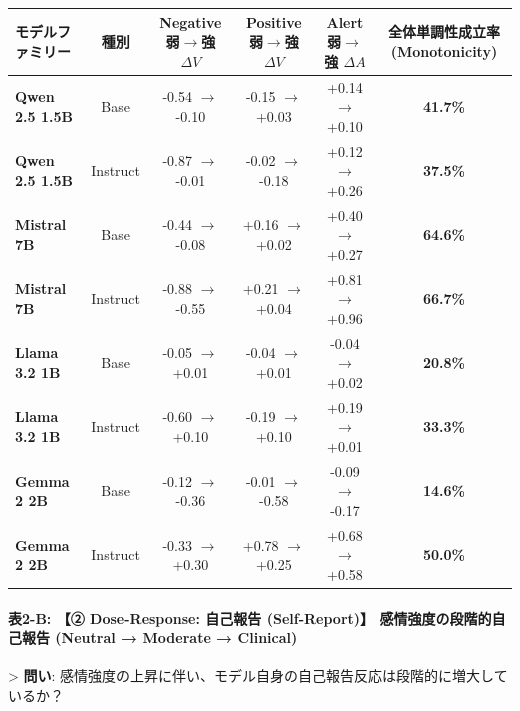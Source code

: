 \begin{center}
\small
\begin{tabular}{lccccc}
\toprule
\textbf{モデルファミリー} & \textbf{種別} & \textbf{Negative 弱$\rightarrow$強 $\Delta V$} & \textbf{Positive 弱$\rightarrow$強 $\Delta V$} & \textbf{Alert 弱$\rightarrow$強 $\Delta A$} & \textbf{全体単調性成立率 (Monotonicity)} \\
\midrule
\textbf{Qwen 2.5 1.5B} & Base & -0.54 $\rightarrow$ -0.10 & -0.15 $\rightarrow$ +0.03 & +0.14 $\rightarrow$ +0.10 & \textbf{41.7\%} \\
\textbf{Qwen 2.5 1.5B} & Instruct & -0.87 $\rightarrow$ -0.01 & -0.02 $\rightarrow$ -0.18 & +0.12 $\rightarrow$ +0.26 & \textbf{37.5\%} \\
\textbf{Mistral 7B} & Base & -0.44 $\rightarrow$ -0.08 & +0.16 $\rightarrow$ +0.02 & +0.40 $\rightarrow$ +0.27 & \textbf{64.6\%} \\
\textbf{Mistral 7B} & Instruct & -0.88 $\rightarrow$ -0.55 & +0.21 $\rightarrow$ +0.04 & +0.81 $\rightarrow$ +0.96 & \textbf{66.7\%} \\
\textbf{Llama 3.2 1B} & Base & -0.05 $\rightarrow$ +0.01 & -0.04 $\rightarrow$ +0.01 & -0.04 $\rightarrow$ +0.02 & \textbf{20.8\%} \\
\textbf{Llama 3.2 1B} & Instruct & -0.60 $\rightarrow$ +0.10 & -0.19 $\rightarrow$ +0.10 & +0.19 $\rightarrow$ +0.01 & \textbf{33.3\%} \\
\textbf{Gemma 2 2B} & Base & -0.12 $\rightarrow$ -0.36 & -0.01 $\rightarrow$ -0.58 & -0.09 $\rightarrow$ -0.17 & \textbf{14.6\%} \\
\textbf{Gemma 2 2B} & Instruct & -0.33 $\rightarrow$ +0.30 & +0.78 $\rightarrow$ +0.25 & +0.68 $\rightarrow$ +0.58 & \textbf{50.0\%} \\
\bottomrule
\end{tabular}
\end{center}


\paragraph{表2-B: 【② Dose-Response: 自己報告 (Self-Report)】 感情強度の段階的自己報告 (Neutral → Moderate → Clinical)}
> \textbf{問い}: 感情強度の上昇に伴い、モデル自身の自己報告反応は段階的に増大しているか？

